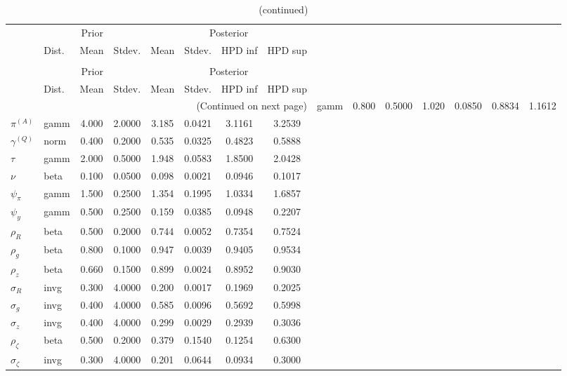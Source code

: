  
\begin{center}
\begin{longtable}{llcccccc} 
\caption{Results from Metropolis-Hastings (parameters)}
 \label{Table:MHPosterior:1}\\
\toprule 
  & \multicolumn{3}{c}{Prior}  &  \multicolumn{4}{c}{Posterior} \\
  \cmidrule(r{.75em}){2-4} \cmidrule(r{.75em}){5-8}
  & Dist. & Mean  & Stdev. & Mean & Stdev. & HPD inf & HPD sup\\
\midrule \endfirsthead 
\caption{(continued)}\\\toprule 
  & \multicolumn{3}{c}{Prior}  &  \multicolumn{4}{c}{Posterior} \\
  \cmidrule(r{.75em}){2-4} \cmidrule(r{.75em}){5-8}
  & Dist. & Mean  & Stdev. & Mean & Stdev. & HPD inf & HPD sup\\
\midrule \endhead 
\bottomrule \multicolumn{8}{r}{(Continued on next page)} \endfoot 
\bottomrule \endlastfoot 
${r_{A}}$ & gamm &   0.800 & 0.5000 &   1.020& 0.0850 &  0.8834 &  1.1612 \\ 
${\pi^{(A)}}$ & gamm &   4.000 & 2.0000 &   3.185& 0.0421 &  3.1161 &  3.2539 \\ 
${\gamma^{(Q)}}$ & norm &   0.400 & 0.2000 &   0.535& 0.0325 &  0.4823 &  0.5888 \\ 
${\tau}$ & gamm &   2.000 & 0.5000 &   1.948& 0.0583 &  1.8500 &  2.0428 \\ 
${\nu}$ & beta &   0.100 & 0.0500 &   0.098& 0.0021 &  0.0946 &  0.1017 \\ 
${\psi_\pi}$ & gamm &   1.500 & 0.2500 &   1.354& 0.1995 &  1.0334 &  1.6857 \\ 
${\psi_y}$ & gamm &   0.500 & 0.2500 &   0.159& 0.0385 &  0.0948 &  0.2207 \\ 
${\rho_R}$ & beta &   0.500 & 0.2000 &   0.744& 0.0052 &  0.7354 &  0.7524 \\ 
${\rho_{g}}$ & beta &   0.800 & 0.1000 &   0.947& 0.0039 &  0.9405 &  0.9534 \\ 
${\rho_z}$ & beta &   0.660 & 0.1500 &   0.899& 0.0024 &  0.8952 &  0.9030 \\ 
${\sigma_R}$ & invg &   0.300 & 4.0000 &   0.200& 0.0017 &  0.1969 &  0.2025 \\ 
${\sigma_{g}}$ & invg &   0.400 & 4.0000 &   0.585& 0.0096 &  0.5692 &  0.5998 \\ 
${\sigma_z}$ & invg &   0.400 & 4.0000 &   0.299& 0.0029 &  0.2939 &  0.3036 \\ 
${\rho_\zeta}$ & beta &   0.500 & 0.2000 &   0.379& 0.1540 &  0.1254 &  0.6300 \\ 
${\sigma_\zeta}$ & invg &   0.300 & 4.0000 &   0.201& 0.0644 &  0.0934 &  0.3000 \\ 
\end{longtable}
 \end{center}
